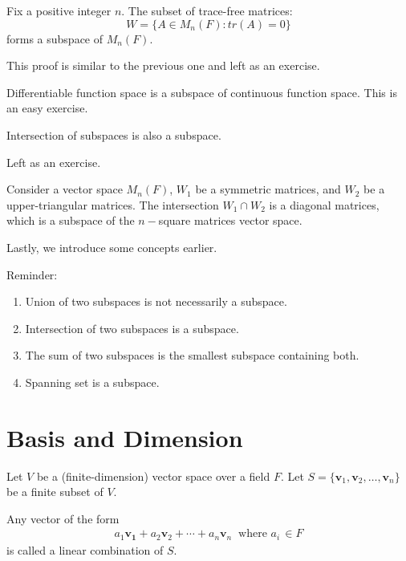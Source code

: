 \documentclass[12pt]{article}
\begin{document}
\begin{theorem}
Fix a positive integer $n$. The subset of trace-free matrices:
\[W=\{A\in M_n(F): tr(A)=0\}\]
forms a subspace of $M_n(F)$.
\end{theorem}

\begin{pf}
    This proof is similar to the previous one and left as an exercise.
\end{pf}

\begin{example}
    Differentiable function space is a subspace of continuous function space. This is an easy exercise.
\end{example}

\begin{theorem}
    Intersection of subspaces is also a subspace.
\end{theorem}
\begin{pf}
    Left as an exercise.
\end{pf}

\begin{example}
    Consider a vector space $M_n(F)$, $W_1$ be a symmetric matrices, and $W_2$ be a upper-triangular matrices.
    The intersection $W_1\cap W_2$ is a diagonal matrices, which is a subspace of the $n-$square matrices vector space. 
\end{example}

Lastly, we introduce some concepts earlier.
\begin{property}
Reminder: 
\begin{enumerate}
    \item Union of two subspaces is not necessarily a subspace.
    \item Intersection of two subspaces is a subspace.
    \item The sum of two subspaces is the smallest subspace containing both.
    \item Spanning set is a subspace.
\end{enumerate}
\end{property}

\newpage
\section{Basis and Dimension}

Let $V$ be a (finite-dimension) vector space over a field $F$.
Let $S=\{\mathbf{v}_1,\mathbf{v}_2,\ldots,\mathbf{v}_n\}$ be a finite subset of $V$.

\begin{definition}
    Any vector of the form
    \begin{align*}
        a_1\mathbf{v_1}+a_2\mathbf{v}_2+\cdots+a_n\mathbf{v}_n\ \text{ where } a_i\, \in F
    \end{align*}
    is called a linear combination of $S$.
\end{definition}
\end{document}
